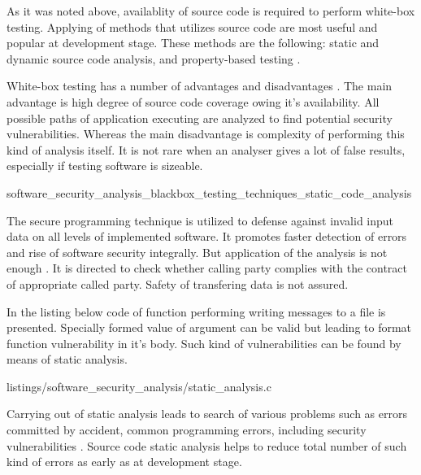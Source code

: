 %
As it was noted above, availablity of source code is required to perform white-box testing. 
%
Applying of methods that utilizes source code are most useful and popular at development stage. 
%
These methods are the following: static and dynamic source code analysis, and property-based testing . 

%
White-box testing has a number of advantages and disadvantages . 
%
The main advantage is high degree of source code coverage owing it's availability. 
%
All possible paths of application executing are analyzed to find potential security vulnerabilities. 
%
Whereas the main disadvantage is complexity of performing this kind of analysis itself. 
%
It is not rare when an analyser gives a lot of false results, especially if testing software is sizeable. 


	{software_security_analysis_blackbox_testing_techniques_static_code_analysis}

%
The secure programming technique  is utilized to defense against invalid input data on all levels of implemented software. 
%
It promotes faster detection of errors and rise of software security integrally. 
%
But application of the analysis is not enough . 
%
It is directed to check whether calling party complies with the contract of appropriate called party. 
%
Safety of transfering data is not assured. 

%
In the listing below code of function performing writing messages to a file is presented. 
%
Specially formed value of  argument can be valid but leading to  format function vulnerability in it's body. 
%
Such kind of vulnerabilities can be found by means of static analysis. 

	{listings/software_security_analysis/static_analysis.c}

%
Carrying out of static analysis leads to search of various problems such as errors committed by accident, common programming errors, including security vulnerabilities . 
%
Source code static analysis helps to reduce total number of such kind of errors as early as at development stage. 

